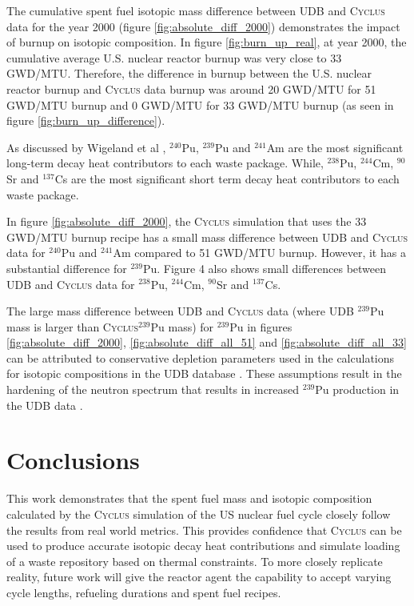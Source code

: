 \documentclass{anstrans}
\newcommand{\Cyclus}{\textsc{Cyclus}\xspace}%
\begin{document}
The 
cumulative spent fuel isotopic mass difference between \gls{UDB} and \Cyclus data for 
the year 2000 (figure \ref{fig:absolute_diff_2000}) demonstrates the impact of 
burnup on isotopic composition.  In figure 
\ref{fig:burn_up_real}, at year 2000, the cumulative average U.S. nuclear 
reactor burnup was very close to 33 GWD/MTU. Therefore, the difference in 
burnup between the U.S. nuclear reactor burnup and \Cyclus data burnup was 
around 20 GWD/MTU for 51 GWD/MTU burnup and 0 GWD/MTU for 33 GWD/MTU burnup 
(as seen in figure \ref{fig:burn_up_difference}). 

As discussed by Wigeland et al \cite{wigeland_separations_2006}, $^{240}$Pu, 
$^{239}$Pu and $^{241}$Am are the most significant long-term decay heat 
contributors to each waste package. While, $^{238}$Pu, $^{244}$Cm, $^{90}$Sr 
and $^{137}$Cs are the most significant short term decay heat contributors 
\cite{wigeland_separations_2006} to each waste package. 


In figure \ref{fig:absolute_diff_2000}, the \Cyclus simulation that uses the 33 
GWD/MTU burnup recipe has a small mass difference between \gls{UDB} and \Cyclus data 
for $^{240}$Pu and $^{241}$Am compared to 51 GWD/MTU burnup. However, it has a 
substantial difference for $^{239}$Pu. Figure 4 also shows small differences 
between \gls{UDB} and \Cyclus data for $^{238}$Pu, $^{244}$Cm, $^{90}$Sr and 
$^{137}$Cs. 

The large mass difference between \gls{UDB} and \Cyclus data (where \gls{UDB} $^{239}$Pu 
mass is larger than \Cyclus $^{239}$Pu mass) for $^{239}$Pu in figures 
\ref{fig:absolute_diff_2000}, \ref{fig:absolute_diff_all_51} and 
\ref{fig:absolute_diff_all_33} can be attributed to conservative depletion 
parameters used in the calculations for isotopic compositions in the \gls{UDB} 
database \cite{peterson_additional_2017}. These assumptions result in the 
hardening of the neutron spectrum that results in increased $^{239}$Pu 
production in the \gls{UDB} data \cite{peterson_additional_2017}. 

\section{Conclusions}
This work demonstrates that the spent fuel mass and isotopic composition 
calculated by the \Cyclus simulation of the \gls{US} nuclear fuel cycle 
closely follow the results from real world metrics. This provides confidence 
that \Cyclus can be used to produce accurate isotopic decay heat contributions and 
simulate loading of a waste repository based on thermal constraints. 
To more closely replicate reality, future work will give the reactor agent the 
capability to accept varying cycle lengths, refueling durations and spent fuel 
recipes.
\end{document}
